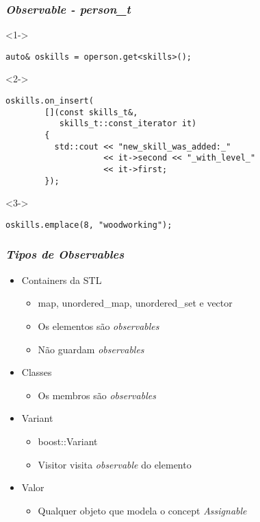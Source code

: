 \documentclass[t]{beamer}
\begin{document}
\begin{frame}[fragile]
  \frametitle{\textit{Observable - person\_t}}

  \begin{onlyenv}<1->
  \begin{lstlisting}[basicstyle=\small]
    auto& oskills = operson.get<skills>();
  \end{lstlisting}
  \end{onlyenv}

  \begin{onlyenv}<2->
  \begin{lstlisting}[basicstyle=\small]
    oskills.on_insert(
        [](const skills_t&, 
           skills_t::const_iterator it)
        {
          std::cout << "new_skill_was_added:_"
                    << it->second << "_with_level_"
                    << it->first;
        });
  \end{lstlisting}
  \end{onlyenv}

  \begin{onlyenv}<3->
  \begin{lstlisting}[basicstyle=\small]
    oskills.emplace(8, "woodworking");
  \end{lstlisting}
  \end{onlyenv}
\end{frame}

\begin{frame}[fragile]
  \frametitle{\textit{Tipos de \textit{Observables}}}
  \begin{itemize}
    \item<1->{Containers da STL}
      \begin{itemize}
      \item<1->{map, unordered\_map, unordered\_set e vector}
      \item<2->{Os elementos são \textit{observables}}
      \item<3->{Não guardam \textit{observables}}
      \end{itemize}
    \item<4->{Classes}
      \begin{itemize}
      \item<4->{Os membros são \textit{observables}}
      \end{itemize}
    \item<5->{Variant}
      \begin{itemize}
      \item<5->{boost::Variant}
      \item<6->{Visitor visita \textit{observable} do elemento}
      \end{itemize}
    \item<7->{Valor}
      \begin{itemize}
      \item<7->{Qualquer objeto que modela o concept \textit{Assignable}}
      \end{itemize}
  \end{itemize}
\end{frame}
\end{document}
